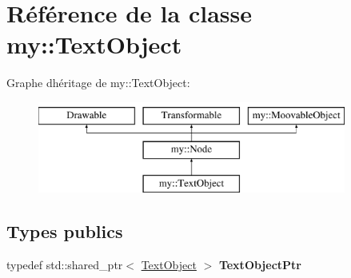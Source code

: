 \hypertarget{classmy_1_1TextObject}{}\section{Référence de la classe my\+:\+:Text\+Object}
\label{classmy_1_1TextObject}
Graphe d\textquotesingle{}héritage de my\+:\+:Text\+Object\+:\begin{figure}[H]
\begin{center}
\leavevmode
\includegraphics[height=3.000000cm]{classmy_1_1TextObject}
\end{center}
\end{figure}
\subsection*{Types publics}
\begin{DoxyCompactItemize}
\item 
\mbox{\label{classmy_1_1TextObject_aea72cf536c84838a0db2be2204db2ba8}} 
typedef std\+::shared\+\_\+ptr$<$ \hyperlink{classmy_1_1TextObject}{Text\+Object} $>$ {\bfseries Text\+Object\+Ptr}
\end{DoxyCompactItemize}
